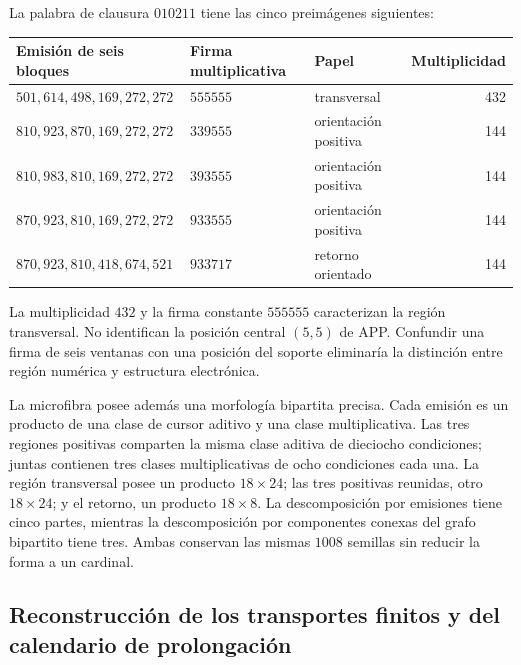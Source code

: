 La palabra de clausura \(010211\) tiene las cinco preimágenes siguientes:
\begin{center}\small
\begin{tabular}{@{}lll r@{}}\toprule
Emisión de seis bloques&Firma multiplicativa&Papel&Multiplicidad\\\midrule
\(501,614,498,169,272,272\)&\(555555\)&transversal&432\\
\(810,923,870,169,272,272\)&\(339555\)&orientación positiva&144\\
\(810,983,810,169,272,272\)&\(393555\)&orientación positiva&144\\
\(870,923,810,169,272,272\)&\(933555\)&orientación positiva&144\\
\(870,923,810,418,674,521\)&\(933717\)&retorno orientado&144\\\bottomrule
\end{tabular}
\end{center}
La multiplicidad \(432\) y la firma constante \(555555\) caracterizan la región transversal. No identifican la posición central \((5,5)\) de APP. Confundir una firma de seis ventanas con una posición del soporte eliminaría la distinción entre región numérica y estructura electrónica.

La microfibra posee además una morfología bipartita precisa. Cada emisión es un producto de una clase de cursor aditivo y una clase multiplicativa. Las tres regiones positivas comparten la misma clase aditiva de dieciocho condiciones; juntas contienen tres clases multiplicativas de ocho condiciones cada una. La región transversal posee un producto \(18\times24\); las tres positivas reunidas, otro \(18\times24\); y el retorno, un producto \(18\times8\). La descomposición por emisiones tiene cinco partes, mientras la descomposición por componentes conexas del grafo bipartito tiene tres. Ambas conservan las mismas \(1008\) semillas sin reducir la forma a un cardinal.

\subsection{Reconstrucción de los transportes finitos y del calendario de prolongación}

